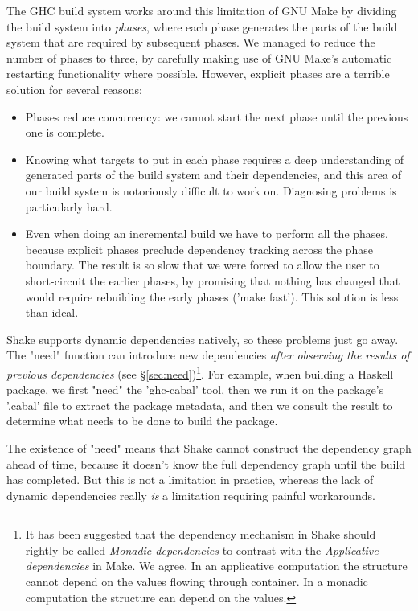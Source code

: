 The GHC build system works around this limitation of GNU Make by
dividing the build system into \emph{phases}, where each phase
generates the parts of the build system that are required by
subsequent phases. We managed to reduce the number of phases to
three, by carefully making use of GNU Make's automatic restarting
functionality where possible. However, explicit phases are a terrible
solution for several reasons:

\begin{itemize}
\item Phases reduce concurrency: we cannot start the next phase until
  the previous one is complete.
\item Knowing what targets to put in each phase requires a deep
  understanding of generated parts of the build system and their dependencies,
  and this area of our build system is notoriously difficult to work on. 
  Diagnosing problems is particularly hard.
\item Even when doing an incremental build we have to perform all the
  phases, because explicit phases preclude dependency tracking across
  the phase boundary.  The result is so slow that we were forced to allow
  the user to short-circuit the earlier phases, by promising
  that nothing has changed that would require rebuilding
  the early phases (\lst'make fast').  This solution is less than
  ideal.
\end{itemize}

Shake supports dynamic dependencies natively, so these problems just
go away.  The \lst"need" function can introduce new dependencies
\emph{after observing the results of previous dependencies}
(see \S\ref{sec:need})\footnote{It has been
suggested that the dependency mechanism in Shake should rightly be called
\emph{Monadic dependencies} to contrast with the \emph{Applicative dependencies}
in Make. We agree. In an applicative computation the structure cannot depend on
the values flowing through container. In a monadic computation the structure can
depend on the values.}. For example, when building a Haskell package, we first
\lst"need" the \lst'ghc-cabal' tool, then we run it on the package's \lst'.cabal' file to
extract the package metadata, and then we consult the result to determine what
needs to be done to build the package.

The existence of \lst"need" means that Shake cannot construct the
dependency graph ahead of time, because it doesn't know the full
dependency graph until the build has completed.  But this is not a
limitation in practice, whereas the lack of dynamic dependencies really
\emph{is} a limitation requiring painful workarounds.


